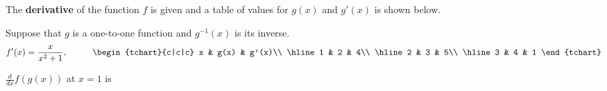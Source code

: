 \documentclass{ximera}
\author{Gregory Hartman \and Matthew Carr}
\begin{document}
\begin{exercise}


The \textbf{derivative} of the function $f$ is given and a table of values for $g(x)$ and $g'(x)$ is shown below.

Suppose that $g$ is a one-to-one function and $g^{-1}(x)$ is its inverse.
\[
f'(x)=\frac{x}{x^2+1},\hskip 1cm
\begin{tchart}{c|c|c}
x & g(x) & g'(x)\\ \hline
1 & 2 & 4\\ \hline
2 & 3 & 5\\ \hline
3 & 4 & 1
\end{tchart}
\]

$\frac{d}{dx}f(g(x))$ at $x=1$ is
\begin{prompt}
\begin{multipleChoice}
\end{multipleChoice}
\end{prompt}

\end{exercise}
\end{document}
